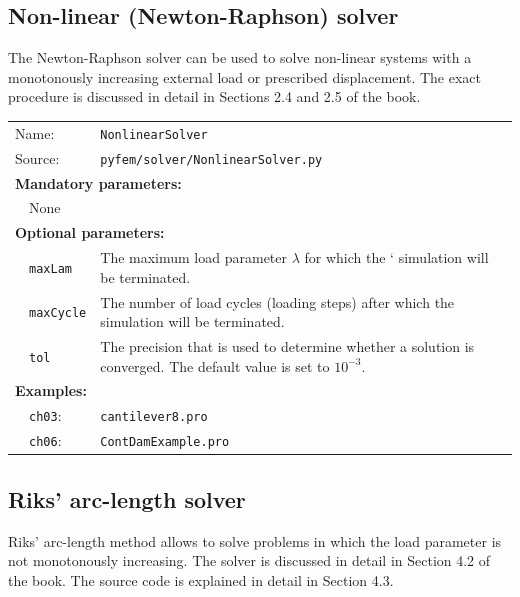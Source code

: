 \documentclass{article}
\begin{document}
\subsection{Non-linear (Newton-Raphson) solver}

The Newton-Raphson solver can be used to solve non-linear systems
with a monotonously increasing external load or prescribed displacement. The
exact procedure is discussed in detail in Sections 2.4 and 2.5 of the book.

\vspace{2mm}
\begin{tabular}{p{22mm}p{74mm}}
Name:    & \texttt{NonlinearSolver} \\
Source:  & \texttt{pyfem/solver/NonlinearSolver.py} \\
\multicolumn{2}{l}{\textbf{Mandatory parameters:}} \\
~~None & \\
\multicolumn{2}{l}{\textbf{Optional parameters:}} \\ 
~~\texttt{maxLam}    & The maximum load parameter $\lambda$ for which the
                      ` simulation will be terminated.\\
~~\texttt{maxCycle}  & The number of load cycles (loading steps) after which the simulation will be terminated.\\
~~\texttt{tol}       & The precision that is used to determine whether a solution is converged. The 
                       default value is set to $10^{-3}$.\\
\multicolumn{2}{l}{\textbf{Examples:}}\\
~~\texttt{ch03}: & \texttt{cantilever8.pro}\\
~~\texttt{ch06}: & \texttt{ContDamExample.pro}
\end{tabular}

\subsection{Riks' arc-length solver}

Riks' arc-length method allows to solve problems in which the load parameter is not monotonously increasing. The
solver is discussed in detail in Section 4.2 of the book. The source code is explained in detail in Section 4.3.
\end{document}
